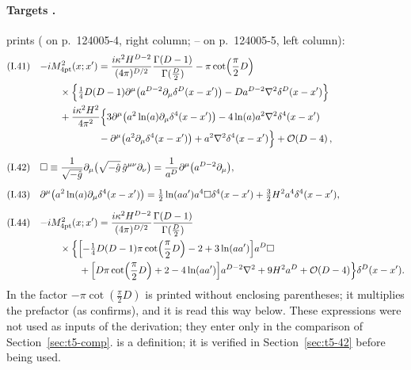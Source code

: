 \paragraph{Targets \tP.} \PI{} prints ( on p.~124005-4, right column; --
on p.~124005-5, left column):
\begin{align*}
\text{(I.41)}\quad &{-i}M^2_{\rm 4pt}(x;x')=\frac{i\kappa^2H^{D-2}}{(4\pi)^{D/2}}\frac{\Gamma(D-1)}{\Gamma(\frac D2)}
-\pi\cot\Bigl(\frac\pi2D\Bigr)\\
&\qquad\times\Bigl\{\tfrac14D(D-1)\partial^\mu\bigl(a^{D-2}\partial_\mu\delta^D(x-x')\bigr)-Da^{D-2}\nabla^2\delta^D(x-x')\Bigr\}\\
&\qquad+\frac{i\kappa^2H^2}{4\pi^2}\Bigl\{3\partial^\mu\bigl(a^2\ln(a)\partial_\mu\delta^4(x-x')\bigr)-4\ln(a)a^2\nabla^2\delta^4(x-x')\\
&\qquad\qquad\qquad-\partial^\mu\bigl(a^2\partial_\mu\delta^4(x-x')\bigr)+a^2\nabla^2\delta^4(x-x')\Bigr\}+\mathcal{O}\!\left(D-4\right),\\[6pt]
\text{(I.42)}\quad &\square\equiv\frac1{\sqrt{-\hat g}}\partial_\mu\bigl(\sqrt{-\hat g}\,\hat g^{\mu\nu}\partial_\nu\bigr)=\frac1{a^D}\partial^\mu\bigl(a^{D-2}\partial_\mu\bigr),\\[6pt]
\text{(I.43)}\quad &\partial^\mu\bigl(a^2\ln(a)\partial_\mu\delta^4(x-x')\bigr)=\tfrac12\ln(aa')a^4\square\delta^4(x-x')+\tfrac32H^2a^4\delta^4(x-x'),\\[6pt]
\text{(I.44)}\quad &{-i}M^2_{\rm 4pt}(x;x')=\frac{i\kappa^2H^{D-2}}{(4\pi)^{D/2}}\frac{\Gamma(D-1)}{\Gamma(\frac D2)}\\
&\qquad\times\Bigl\{\Bigl[-\tfrac14D(D-1)\pi\cot\Bigl(\frac\pi2D\Bigr)-2+3\ln(aa')\Bigr]a^D\square\\
&\qquad\qquad+\Bigl[D\pi\cot\Bigl(\frac\pi2D\Bigr)+2-4\ln(aa')\Bigr]a^{D-2}\nabla^2+9H^2a^D+\mathcal{O}\!\left(D-4\right)\Bigr\}\delta^D(x-x') .
\end{align*}
In  the factor \(-\pi\cot(\frac\pi2D)\) is printed without enclosing
parentheses; it multiplies the prefactor (as  confirms), and it is read this
way below.
These expressions were not used as inputs of the derivation; they enter only in the
comparison of Section~\ref{sec:t5-comp}.  is a definition; it is verified in
Section~\ref{sec:t5-42} before being used.

